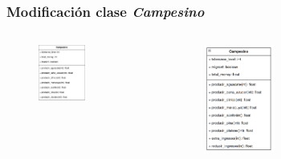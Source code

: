 \documentclass[17pt, t, lualatex]{beamer}
\begin{document}
\insertsectionpage

\begin{frame}
  \frametitle{Modificación clase \textit{Campesino}}


\begin{columns}
  \begin{column}{.5\textwidth}
  \begin{figure}[ht]
    \centering
    \includegraphics[width = 0.55\textwidth]{img/ClaseCampesino.png}
  \end{figure}  
  \end{column}

  \begin{column}{.5\textwidth}
\begin{figure}[ht]
    \centering
    \includegraphics[width = 0.4\textwidth]{img/img2.png}
  \end{figure}
  \end{column}
\end{columns}
    


\end{frame}
\end{document}
